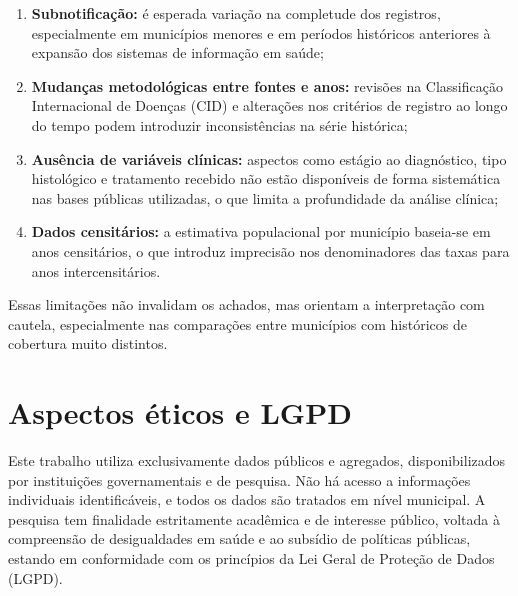 \begin{enumerate}
    \item \textbf{Subnotificação:} é esperada variação na completude dos registros, especialmente em municípios menores e em períodos históricos anteriores à expansão dos sistemas de informação em saúde;
    \item \textbf{Mudanças metodológicas entre fontes e anos:} revisões na Classificação Internacional de Doenças (CID) e alterações nos critérios de registro ao longo do tempo podem introduzir inconsistências na série histórica;
    \item \textbf{Ausência de variáveis clínicas:} aspectos como estágio ao diagnóstico, tipo histológico e tratamento recebido não estão disponíveis de forma sistemática nas bases públicas utilizadas, o que limita a profundidade da análise clínica;
    \item \textbf{Dados censitários:} a estimativa populacional por município baseia-se em anos censitários, o que introduz imprecisão nos denominadores das taxas para anos intercensitários.
\end{enumerate}

Essas limitações não invalidam os achados, mas orientam a interpretação com cautela, especialmente nas comparações entre municípios com históricos de cobertura muito distintos.

\section{Aspectos éticos e LGPD}

Este trabalho utiliza exclusivamente dados públicos e agregados, disponibilizados por instituições governamentais e de pesquisa. Não há acesso a informações individuais identificáveis, e todos os dados são tratados em nível municipal. A pesquisa tem finalidade estritamente acadêmica e de interesse público, voltada à compreensão de desigualdades em saúde e ao subsídio de políticas públicas, estando em conformidade com os princípios da Lei Geral de Proteção de Dados (LGPD).

